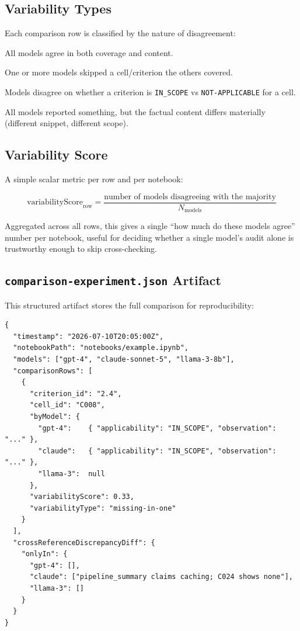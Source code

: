 \documentclass[11pt, a4paper]{article}
\begin{document}
\subsection{Variability Types}

Each comparison row is classified by the nature of disagreement:

\begin{description}[leftmargin=*]
  \item[\texttt{consistent}] All models agree in both coverage and content.
  \item[\texttt{missing-in-one}] One or more models skipped a cell/criterion
        the others covered.
  \item[\texttt{applicability-disagreement}] Models disagree on whether a
        criterion is \texttt{IN\_SCOPE} vs \texttt{NOT-APPLICABLE} for a cell.
  \item[\texttt{text-divergence}] All models reported something, but the
        factual content differs materially (different snippet, different scope).
\end{description}

\subsection{Variability Score}

A simple scalar metric per row and per notebook:

\[
\text{variabilityScore}_{\text{row}} = \frac{\text{number of models disagreeing with the majority}}{N_{\text{models}}}
\]

Aggregated across all rows, this gives a single ``how much do these models
agree'' number per notebook, useful for deciding whether a single model's audit
alone is trustworthy enough to skip cross-checking.

\subsection{\texttt{comparison-experiment.json} Artifact}

This structured artifact stores the full comparison for reproducibility:

\begin{lstlisting}[style=json]
{
  "timestamp": "2026-07-10T20:05:00Z",
  "notebookPath": "notebooks/example.ipynb",
  "models": ["gpt-4", "claude-sonnet-5", "llama-3-8b"],
  "comparisonRows": [
    {
      "criterion_id": "2.4",
      "cell_id": "C008",
      "byModel": {
        "gpt-4":    { "applicability": "IN_SCOPE", "observation": "..." },
        "claude":   { "applicability": "IN_SCOPE", "observation": "..." },
        "llama-3":  null
      },
      "variabilityScore": 0.33,
      "variabilityType": "missing-in-one"
    }
  ],
  "crossReferenceDiscrepancyDiff": {
    "onlyIn": {
      "gpt-4": [],
      "claude": ["pipeline_summary claims caching; C024 shows none"],
      "llama-3": []
    }
  }
}
\end{lstlisting}
\end{document}
